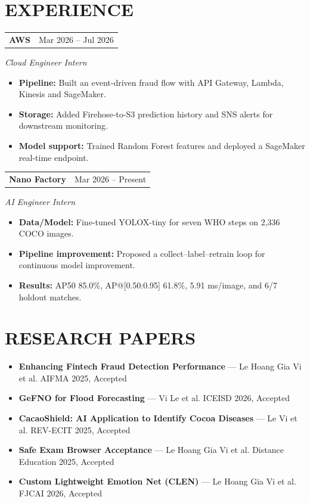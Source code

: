 \documentclass[10pt,letterpaper]{article}
\makeatletter
\newcommand{\cvsection}[2]{\section*{\faIcon{#1}\hspace{0.45em}#2}}
\newcommand{\cvjobentry}[3]{%
  \begin{tabularx}{\textwidth}{@{}X>{\raggedleft\arraybackslash}p{1.52in}@{}}
    \textbf{#1} & \normalsize #2 \\
  \end{tabularx}\par
  \vspace{0.10em}\normalsize\textit{#3}\par\vspace{0.08em}
}
\newcommand{\paperentry}[3]{%
  \item \small \textbf{#1} --- #2 \hfill #3
}
\makeatother
\begin{document}
\cvsection{briefcase}{EXPERIENCE}
\cvjobentry{AWS}{Mar 2026 -- Jul 2026}{Cloud Engineer Intern}
\begin{itemize}[leftmargin=1.75em,itemsep=0.10em,topsep=0.16em]
  \item \normalsize \textbf{Pipeline:} Built an event-driven fraud flow with API Gateway, Lambda, Kinesis and SageMaker.
  \item \normalsize \textbf{Storage:} Added Firehose-to-S3 prediction history and SNS alerts for downstream monitoring.
  \item \normalsize \textbf{Model support:} Trained Random Forest features and deployed a SageMaker real-time endpoint.
\end{itemize}
\vspace{0.45em}
\cvjobentry{Nano Factory}{Mar 2026 -- Present}{AI Engineer Intern}
\begin{itemize}[leftmargin=1.75em,itemsep=0.10em,topsep=0.16em]
  \item \normalsize \textbf{Data/Model:} Fine-tuned YOLOX-tiny for seven WHO steps on 2,336 COCO images.
  \item \normalsize \textbf{Pipeline improvement:} Proposed a collect--label--retrain loop for continuous model improvement.
  \item \normalsize \textbf{Results:} AP50 85.0\%, AP@[0.50:0.95] 61.8\%, 5.91 ms/image, and 6/7 holdout matches.
\end{itemize}

\cvsection{book}{RESEARCH PAPERS}
\begin{itemize}[leftmargin=1.45em,itemsep=0em,topsep=0em,parsep=0em,partopsep=0em]
  \paperentry{Enhancing Fintech Fraud Detection Performance}{Le Hoang Gia Vi et al.}{AIFMA 2025, Accepted}
  \paperentry{GeFNO for Flood Forecasting}{Vi Le et al.}{ICEISD 2026, Accepted}
  \paperentry{CacaoShield: AI Application to Identify Cocoa Diseases}{Le Vi et al.}{REV-ECIT 2025, Accepted}
  \paperentry{Safe Exam Browser Acceptance}{Le Hoang Gia Vi et al.}{Distance Education 2025, Accepted}
  \paperentry{Custom Lightweight Emotion Net (CLEN)}{Le Hoang Gia Vi et al.}{FJCAI 2026, Accepted}
\end{itemize}
\end{document}
